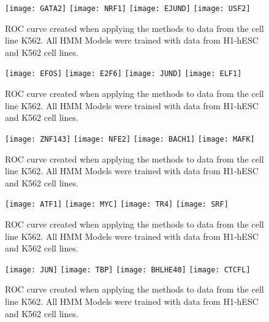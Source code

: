 \documentclass[11pt,a4]{article}
\begin{document}
\begin{figure}[h]
\centering
    \texttt{[image: GATA2]}
    \texttt{[image: NRF1]}
    \texttt{[image: EJUND]}
    \texttt{[image: USF2]}
\caption{ROC curve created when applying the methods to data from the cell line K562. All HMM Models were trained with data from H1-hESC and K562 cell lines.}
\label{fig:roc.K562.fdr_4.6}
\end{figure}

\begin{figure}[h]
\centering
    \texttt{[image: EFOS]}
    \texttt{[image: E2F6]}
    \texttt{[image: JUND]}
    \texttt{[image: ELF1]}
\caption{ROC curve created when applying the methods to data from the cell line K562. All HMM Models were trained with data from H1-hESC and K562 cell lines.}
\label{fig:roc.K562.fdr_4.7}
\end{figure}

\begin{figure}[h]
\centering
    \texttt{[image: ZNF143]}
    \texttt{[image: NFE2]}
    \texttt{[image: BACH1]}
    \texttt{[image: MAFK]}
\caption{ROC curve created when applying the methods to data from the cell line K562. All HMM Models were trained with data from H1-hESC and K562 cell lines.}
\label{fig:roc.K562.fdr_4.8}
\end{figure}

\begin{figure}[h]
\centering
    \texttt{[image: ATF1]}
    \texttt{[image: MYC]}
    \texttt{[image: TR4]}
    \texttt{[image: SRF]}
\caption{ROC curve created when applying the methods to data from the cell line K562. All HMM Models were trained with data from H1-hESC and K562 cell lines.}
\label{fig:roc.K562.fdr_4.9}
\end{figure}

\begin{figure}[h]
\centering
    \texttt{[image: JUN]}
    \texttt{[image: TBP]}
    \texttt{[image: BHLHE40]}
    \texttt{[image: CTCFL]}
\caption{ROC curve created when applying the methods to data from the cell line K562. All HMM Models were trained with data from H1-hESC and K562 cell lines.}
\label{fig:roc.K562.fdr_4.10}
\end{figure}
\end{document}
